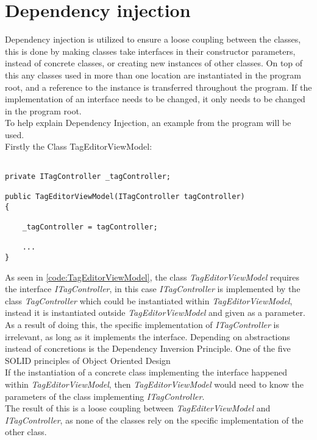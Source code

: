 \section{Dependency injection} \label{sc:DependencyInjection}
Dependency injection is utilized to ensure a loose coupling between the classes, this is done by making classes take interfaces in their constructor parameters, instead of concrete classes, or creating new instances of other classes. On top of this any classes used in more than one location are instantiated in the program root, and a reference to the instance is transferred throughout the program. If the implementation of an interface needs to be changed, it only needs to be changed in the program root. \\
To help explain Dependency Injection, an example from the program will be used.\\
Firstly the Class TagEditorViewModel:

\begin{listing}[H]
\begin{verbatim}

private ITagController _tagController;

public TagEditorViewModel(ITagController tagController)
{
    
    _tagController = tagController;
    
    ...
}

\end{verbatim}
\label{code:TagEditorViewModel}
\end{listing}

As seen in \autoref{code:TagEditorViewModel}, the class \textit{TagEditorViewModel} requires the interface \textit{ITagController}, in this case \textit{ITagController} is implemented by the class \textit{TagController} which  could be instantiated within \textit{TagEditorViewModel}, instead it is instantiated outside  \textit{TagEditorViewModel} and given as a parameter. As a result of doing this, the specific implementation of \textit{ITagController} is irrelevant, as long as it implements the interface. Depending on abstractions instead of concretions is the Dependency Inversion Principle. One of the five SOLID principles of Object Oriented Design \citep{AgilePPP} \\
If the instantiation of a concrete class implementing the interface happened within \textit{TagEditorViewModel}, then \textit{TagEditorViewModel} would need to know the parameters of the class implementing \textit{ITagController}. \\
The result of this is a loose coupling between \textit{TagEditerViewModel} and \textit{ITagController}, as none of the classes rely on the specific implementation of the other class. \par

